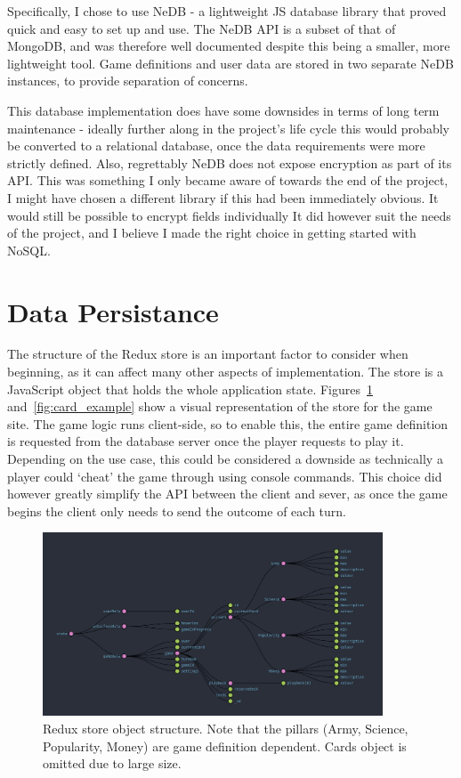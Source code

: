 Specifically, I chose to use NeDB\cite{NeDB} - a lightweight JS database library that proved quick and easy to set up and use. The NeDB API is a subset of that of MongoDB\cite{MongoDB}, and was therefore well documented despite this being a smaller, more lightweight tool. Game definitions and user data are stored in two separate NeDB instances, to provide separation of concerns.

This database implementation does have some downsides in terms of long term maintenance - ideally further along in the project's life cycle this would probably be converted to a relational database, once the data requirements were more strictly defined. Also, regrettably NeDB does not expose encryption as part of its API.
This was something I only became aware of towards the end of the project, I might have chosen a different library if this had been immediately obvious. It would still be possible to encrypt fields individually
It did however suit the needs of the project, and I believe I made the right choice in getting started with NoSQL.

\section{Data Persistance}
The structure of the Redux store is an important factor to consider when beginning, as it can affect many other aspects of implementation. The store is a JavaScript object that holds the whole application state. Figures~\ref{fig:store_shape} and~\ref{fig:card_example} show a visual representation of the store for the game site. The game logic runs client-side, so to enable this, the entire game definition is requested from the database server once the player requests to play it. Depending on the use case, this could be considered a downside as technically a player could `cheat' the game through using console commands. This choice did however greatly simplify the API between the client and sever, as once the game begins the client only needs to send the outcome of each turn.

\begin{figure}[!h]
	\centering
	\includegraphics[width=0.9\textwidth]{./images/design/store_shape.png}
	\caption{Redux store object structure. Note that the pillars (Army, Science, Popularity, Money) are game definition dependent. Cards object is omitted due to large size.}
	\label{fig:store_shape}
\end{figure}

